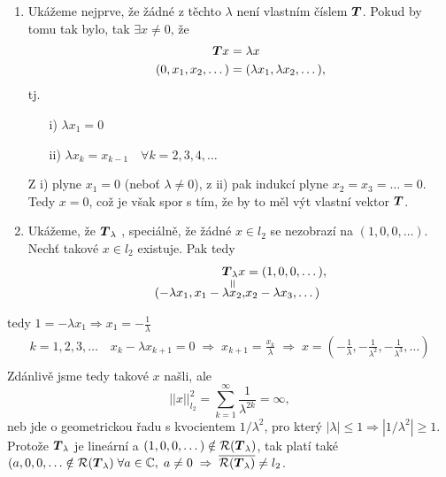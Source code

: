 {\begin{enumerate}
    \item Ukážeme nejprve, že žádné z těchto $\lambda$ není vlastním číslem $\boldsymbol{T}$. Pokud by tomu tak bylo, tak $\exists x\neq0$, že
    \vspace*{-0.5cm}
    \begin{align*}
        \boldsymbol{T} x&=\lambda x\\
        (0,x_1,x_2,\dots)&=(\lambda x_1,\lambda x_2,\dots),
    \end{align*}
    tj.
    \begin{enumerate}
        \item[i)] $\lambda x_1=0$
        \item[ii)] $\lambda x_k=x_{k-1} \quad \forall k=2,3,4,\dots$
    \end{enumerate}
    Z i) plyne $x_1=0$ (neboť $\lambda\neq 0$), z ii) pak indukcí plyne $x_2=x_3=\dots=0$. Tedy $x=0$, což je však spor s tím, že by to měl výt vlastní vektor $\boldsymbol{T}$.
    \item Ukážeme, že $\boldsymbol{T}_\lambda$ , speciálně, že žádné $x\in l_2$ se nezobrazí na $(1,0,0,\dots)$. Nechť takové $x\in l_2$ existuje. Pak tedy
    \vspace*{-0.5cm}
    \begin{align*}
        \underset{\rotatebox[origin=c]{90}{=}}{\map T_\lambda x} &= (1,0,0,\dots),\\[-7pt]
        (-\lambda x_1,x_1-\lambda x_2,&x_2-\lambda x_3,\dots )
    \end{align*}
\end{enumerate}
\vspace*{-0.5cm}
tedy $1=-\lambda x_1 \Rightarrow x_1=-\frac{1}{\lambda}$
\vspace*{-0.5cm}
\begin{align*}
    k=1,2,3,\dots \quad x_k-\lambda x_{k+1}=0 \;\Rightarrow\; x_{k+1}=\frac{x_k}{\lambda} \;\Rightarrow\; x=\left(-\frac{1}{\lambda},-\frac{1}{\lambda^2},-\frac{1}{\lambda^3},\dots\right)\\
\end{align*}
\vspace*{-0.8cm}
Zdánlivě jsme tedy takové $x$ našli, ale
$$ ||x||_{l_2}^2=\sum\limits_{k=1}^\infty\frac{1}{\lambda^{2k}}=\infty,$$
neb jde o geometrickou řadu s kvocientem $1/\lambda^2$, pro který $|\lambda|\leq 1 \Rightarrow |1/\lambda^2|\geq 1$.
Protože $\boldsymbol{T}_\lambda$ je lineární a $(1,0,0,\dots)\notin \mathcal{R}(\boldsymbol{T}_\lambda)$, tak platí také $(a,0,0,\dots \notin \mathcal{R}(\boldsymbol{T}_\lambda)\; \forall a \in \mathbb{C},\;a\neq0\;\Rightarrow\;\overline{\mathcal{R}(\boldsymbol{T}_\lambda)}\neq l_2$.

}

